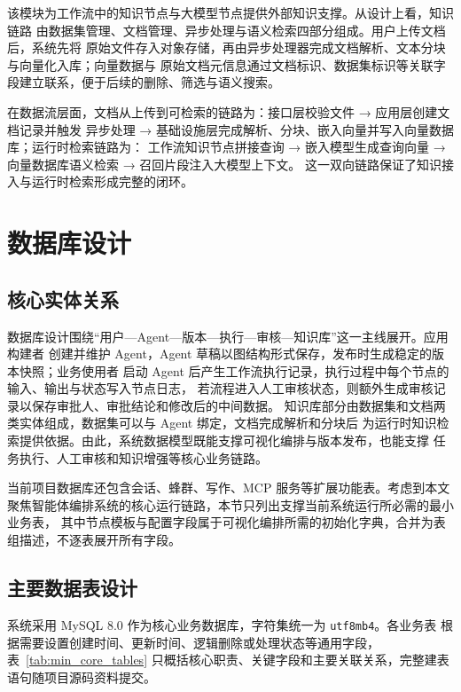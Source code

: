 该模块为工作流中的知识节点与大模型节点提供外部知识支撑。从设计上看，知识链路
由数据集管理、文档管理、异步处理与语义检索四部分组成。用户上传文档后，系统先将
原始文件存入对象存储，再由异步处理器完成文档解析、文本分块与向量化入库；向量数据与
原始文档元信息通过文档标识、数据集标识等关联字段建立联系，便于后续的删除、筛选与语义搜索。

在数据流层面，文档从上传到可检索的链路为：接口层校验文件 → 应用层创建文档记录并触发
异步处理 → 基础设施层完成解析、分块、嵌入向量并写入向量数据库；运行时检索链路为：
工作流知识节点拼接查询 → 嵌入模型生成查询向量 → 向量数据库语义检索 → 召回片段注入大模型上下文。
这一双向链路保证了知识接入与运行时检索形成完整的闭环。

\section{数据库设计}

\subsection{核心实体关系}

数据库设计围绕“用户—Agent—版本—执行—审核—知识库”这一主线展开。应用构建者
创建并维护 Agent，Agent 草稿以图结构形式保存，发布时生成稳定的版本快照；业务使用者
启动 Agent 后产生工作流执行记录，执行过程中每个节点的输入、输出与状态写入节点日志，
若流程进入人工审核状态，则额外生成审核记录以保存审批人、审批结论和修改后的中间数据。
知识库部分由数据集和文档两类实体组成，数据集可以与 Agent 绑定，文档完成解析和分块后
为运行时知识检索提供依据。由此，系统数据模型既能支撑可视化编排与版本发布，也能支撑
任务执行、人工审核和知识增强等核心业务链路。

当前项目数据库还包含会话、蜂群、写作、MCP 服务等扩展功能表。考虑到本文
聚焦智能体编排系统的核心运行链路，本节只列出支撑当前系统运行所必需的最小业务表，
其中节点模板与配置字段属于可视化编排所需的初始化字典，合并为表组描述，不逐表展开所有字段。

\subsection{主要数据表设计}

系统采用 MySQL 8.0 作为核心业务数据库，字符集统一为 \texttt{utf8mb4}。各业务表
根据需要设置创建时间、更新时间、逻辑删除或处理状态等通用字段，表~\ref{tab:min_core_tables}
只概括核心职责、关键字段和主要关联关系，完整建表语句随项目源码资料提交。

